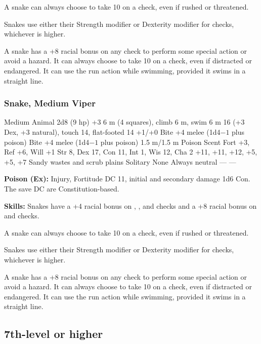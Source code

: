 A snake can always choose to take 10 on a  check, even if rushed or threatened.

Snakes use either their Strength modifier or Dexterity modifier for  checks, whichever is higher.

A snake has a +8 racial bonus on any  check to perform some special action or avoid a hazard. It can always choose to take 10 on a  check, even if distracted or endangered. It can use the run action while swimming, provided it swims in a straight line.

\subsubsection{Snake, Medium Viper}
\begin{MonsterStats}
{Medium Animal}
{2d8 (9 hp)}
{+3}
{6 m (4 squares), climb 6 m, swim 6 m}
{16 (+3 Dex, +3 natural), touch 14, flat-footed 14}
{+1/+0}
{Bite +4 melee (1d4$-1$ plus poison)}
{Bite +4 melee (1d4$-1$ plus poison)}
{1.5 m/1.5 m}
{Poison}
{Scent}
{Fort +3, Ref +6, Will +1}
{Str 8, Dex 17, Con 11, Int 1, Wis 12, Cha 2}
{ +11,  +11,  +12,  +5,  +5,  +7}
{}
{Sandy wastes and scrub plains}
{Solitary}
{\onehalf}
{None}
{Always neutral}
{---}
{---}
\end{MonsterStats}
\textbf{Poison (Ex):} Injury, Fortitude DC 11, initial and secondary damage 1d6 Con. The save DC are Constitution-based.

\textbf{Skills:} Snakes have a +4 racial bonus on , , and  checks and a +8 racial bonus on  and  checks.

A snake can always choose to take 10 on a  check, even if rushed or threatened.

Snakes use either their Strength modifier or Dexterity modifier for  checks, whichever is higher.

A snake has a +8 racial bonus on any  check to perform some special action or avoid a hazard. It can always choose to take 10 on a  check, even if distracted or endangered. It can use the run action while swimming, provided it swims in a straight line.

\subsection{7th-level or higher}

